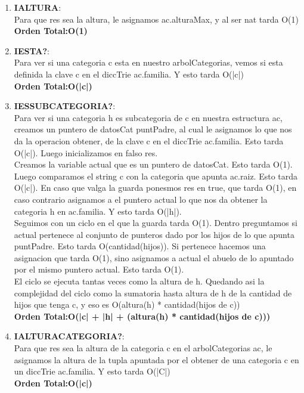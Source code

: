 \documentclass[10pt, a4paper]{article}
\begin{document}
\begin{enumerate}
     \item \textbf{IALTURA}:\\ Para que res sea la altura, le asignamos ac.alturaMax, y al ser nat tarda O(1)\\
	\textbf{Orden Total:}\textbf{O(1)}
      
     \item \textbf{IESTA?}:\\ Para ver si una categoria c esta en nuestro arbolCategorias, vemos si esta definida la clave c en el diccTrie ac.familia. Y esto tarda O(|c|)\\
	\textbf{Orden Total:}\textbf{O(|c|)} 

     \item \textbf{IESSUBCATEGORIA?}:\\ Para ver si una categoria h es subcategoria de c en nuestra estructura ac, creamos un puntero de datosCat puntPadre, al cual le asignamos lo que nos da la operacion obtener, de la clave c en el diccTrie ac.familia. Esto tarda O(|c|). Luego inicializamos en falso res. \\ Creamos la variable actual que es un puntero de datosCat. Esto tarda O(1). Luego comparamos el string c con la categoria que apunta ac.raiz. Esto tarda O(|c|). En caso que valga la guarda ponesmos res en true, que tarda O(1), en caso contrario asignamos a el puntero actual lo que nos da obtener la categoria h en ac.familia. Y esto tarda O(|h|). \\ Seguimos con un ciclo en el que la guarda tarda O(1). Dentro preguntamos si actual pertenece al conjunto de punteros dado por los hijos de lo que apunta puntPadre. Esto tarda O(cantidad(hijos)). Si pertenece hacemos una asignacion que tarda O(1), sino asignamos a actual el abuelo de lo apuntado por el mismo puntero actual. Esto tarda O(1).\\ El ciclo se ejecuta tantas veces como la altura de h. Quedando asi la complejidad del ciclo como la sumatoria hasta altura de h de la cantidad de hijos que tenga c, y eso es O(altura(h) * cantidad(hijos de c))\\
	\textbf{Orden Total:}\textbf{O(|c| + |h| + (altura(h) * cantidad(hijos de c)))} 

     \item \textbf{IALTURACATEGORIA?}:\\ Para que res sea la altura de la categoria c en el arbolCategorias ac, le asignamos la altura de la tupla apuntada por el obtener de una categoria c en un diccTrie ac.familia. Y esto tarda O(|C|)\\
	\textbf{Orden Total:}\textbf{O(|c|)}
      

\end{enumerate}
\end{document}
